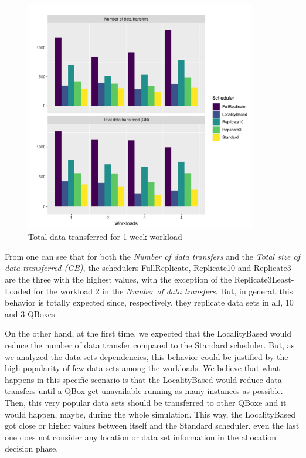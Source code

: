 \begin{figure} [H]
    \centering
    \includegraphics[width=0.9\textwidth]{images/experiments/metrics/full_metrics_data.pdf}
    \caption{Total data transferred for 1 week workload}
    \label{fig:data-set-dependencies}
\end{figure}

From  one can see that for both the \textit{Number of data transfers} and the \textit{Total size of data transferred (GB)}, the schedulers FullReplicate, Replicate10 and Replicate3 are the three with the highest values, with the exception of the Replicate3Least-Loaded for the workload 2 in the \textit{Number of data transfers}. But, in general, this behavior is totally expected since, respectively, they replicate data sets in all, 10 and 3 QBoxes.

On the other hand, at the first time, we expected that the LocalityBased would reduce the number of data transfer compared to the Standard scheduler. But, as we analyzed the data sets dependencies, this behavior could be justified by the high popularity of few data sets among the workloads. We believe that what happens in this specific scenario is that the LocalityBased would reduce data transfers until a QBox get unavailable running as many instances as possible. Then, this very popular data sets should be transferred to other QBoxe and it would happen, maybe, during the whole simulation. This way, the LocalityBased got close or higher values between itself and the Standard scheduler, even the last one does not consider any location or data set information in the allocation decision phase.

